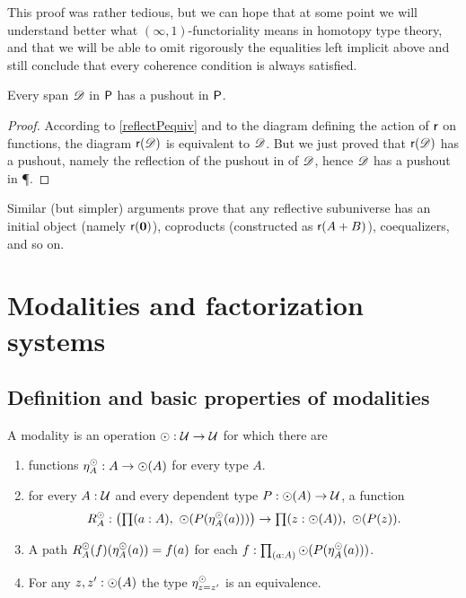 This proof was rather tedious, but we can hope that at some point we will
understand better what $(\infty,1)$-functoriality means in homotopy type theory, and
that we will be able to omit rigorously the equalities left implicit above and still
conclude that every coherence condition is always satisfied.

\begin{cor}
  Every span $\Ddiag$ in $\P$ has a pushout in $\P$.
\end{cor}

\begin{proof}
  According to \autoref{reflectPequiv} and to the diagram defining the action of
  $\reflect$ on functions, the diagram $\reflect(\Ddiag)$ is equivalent to
  $\Ddiag$. But we just proved that $\reflect(\Ddiag)$ has a pushout, namely the
  reflection of the pushout in \type of $\Ddiag$, hence $\Ddiag$ has a pushout
  in \P.
\end{proof}

Similar (but simpler) arguments prove that any reflective subuniverse has an initial object (namely $\reflect(\emptyt)$), coproducts
(constructed as $\reflect(A+B)$), coequalizers, and so on.


\section{Modalities and factorization systems}
\label{sec:modalities}

\subsection{Definition and basic properties of modalities}

\begin{defn}
A modality is an operation $\modal:\type\to\type$ for which there are
\begin{enumerate}
\item functions $\mreturn^\modal_A:A\to\modal(A)$ for every type $A$.
\item for every $A:\type$ and every dependent type $P:\modal(A)\to\type$, a function
\begin{equation*}
R^\modal_A:\big(\prd{a:A}\modal(P(\mreturn^\modal_A(a)))\big)\to\prd{z:\modal(A)}\modal(P(z)).
\end{equation*}
\item A path $R^\modal_A(f)(\mreturn^\modal_A(a))= f(a)$ for each $f:\prd{a:A}\modal(P(\mreturn^\modal_A(a)))$.
\item For any $z,z':\modal(A)$ the type $\mreturn^\modal_{z=z'}$ is an equivalence.
\end{enumerate}
\end{defn}

